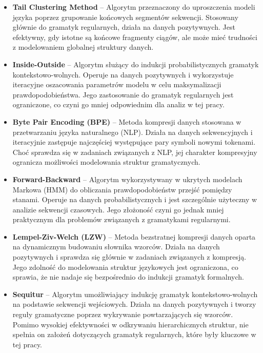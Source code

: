 \begin{itemize}  
    \item \textbf{Tail Clustering Method} – Algorytm przeznaczony do uproszczenia modeli języka poprzez grupowanie końcowych segmentów sekwencji. Stosowany głównie do gramatyk regularnych, działa na danych pozytywnych. Jest efektywny, gdy istotne są końcowe fragmenty ciągów, ale może mieć trudności z modelowaniem globalnej struktury danych.  

    \item \textbf{Inside-Outside} – Algorytm służący do indukcji probabilistycznych gramatyk kontekstowo-wolnych. Operuje na danych pozytywnych i wykorzystuje iteracyjne oszacowania parametrów modelu w celu maksymalizacji prawdopodobieństwa. Jego zastosowanie do gramatyk regularnych jest ograniczone, co czyni go mniej odpowiednim dla analiz w tej pracy.  

    \item \textbf{Byte Pair Encoding (BPE)} – Metoda kompresji danych stosowana w przetwarzaniu języka naturalnego (NLP). Działa na danych sekwencyjnych i iteracyjnie zastępuje najczęściej występujące pary symboli nowymi tokenami. Choć sprawdza się w zadaniach związanych z NLP, jej charakter kompresyjny ogranicza możliwości modelowania struktur gramatycznych.  

    \item \textbf{Forward-Backward} – Algorytm wykorzystywany w ukrytych modelach Markowa (HMM) do obliczania prawdopodobieństw przejść pomiędzy stanami. Operuje na danych probabilistycznych i jest szczególnie użyteczny w analizie sekwencji czasowych. Jego złożoność czyni go jednak mniej praktycznym dla problemów związanych z gramatykami regularnymi.  

    \item \textbf{Lempel-Ziv-Welch (LZW)} – Metoda bezstratnej kompresji danych oparta na dynamicznym budowaniu słownika wzorców. Działa na danych pozytywnych i sprawdza się głównie w zadaniach związanych z kompresją. Jego zdolność do modelowania struktur językowych jest ograniczona, co sprawia, że nie nadaje się bezpośrednio do indukcji gramatyk formalnych.  

    \item \textbf{Sequitur} – Algorytm umożliwiający indukcję gramatyk kontekstowo-wolnych na podstawie sekwencji wejściowych. Działa na danych pozytywnych i tworzy reguły gramatyczne poprzez wykrywanie powtarzających się wzorców. Pomimo wysokiej efektywności w odkrywaniu hierarchicznych struktur, nie spełnia on założeń dotyczących gramatyk regularnych, które były kluczowe w tej pracy.  
\end{itemize}  
 

